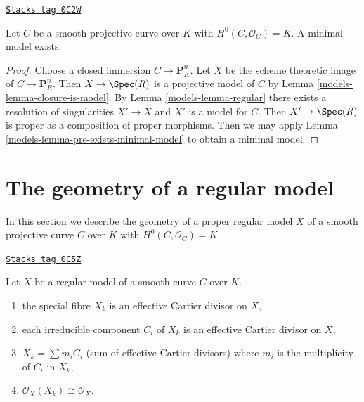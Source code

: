 \begin{proposition}
\label{models-proposition-exists-minimal-model}
\href{https://stacks.math.columbia.edu/tag/0C2W}{\texttt{Stacks tag 0C2W}}

Let $C$ be a smooth projective curve over $K$ with
$H^0(C, \mathcal{O}_C) = K$. A minimal model exists.
\end{proposition}

\begin{proof}

Choose a closed immersion $C \to \mathbf{P}^n_K$. Let
$X$ be the scheme theoretic image of $C \to \mathbf{P}^n_R$.
Then $X \to \Spec(R)$ is a projective model of $C$ by
Lemma \ref{models-lemma-closure-is-model}.
By Lemma \ref{models-lemma-regular} there exists a resolution
of singularities $X' \to X$ and $X'$ is a model for $C$.
Then $X' \to \Spec(R)$ is proper as a composition of proper morphisms.
Then we may apply Lemma \ref{models-lemma-pre-exists-minimal-model}
to obtain a minimal model.
\end{proof}

\section{The geometry of a regular model}
\label{models-section-special-fibre}
In this section we describe the geometry of a proper regular model $X$ of a
smooth projective curve $C$ over $K$ with $H^0(C, \mathcal{O}_C) = K$.

\begin{lemma}
\label{models-lemma-divisor-special-fiber}
\href{https://stacks.math.columbia.edu/tag/0C5Z}{\texttt{Stacks tag 0C5Z}}

Let $X$ be a regular model of a smooth curve $C$ over $K$.
\begin{enumerate}
\item the special fibre $X_k$ is an effective Cartier divisor on $X$,
\item each irreducible component $C_i$ of $X_k$ is an effective
Cartier divisor on $X$,
\item $X_k = \sum m_i C_i$ (sum of effective Cartier divisors)
where $m_i$ is the multiplicity of $C_i$ in $X_k$,
\item $\mathcal{O}_X(X_k) \cong \mathcal{O}_X$.
\end{enumerate}
\end{lemma}

